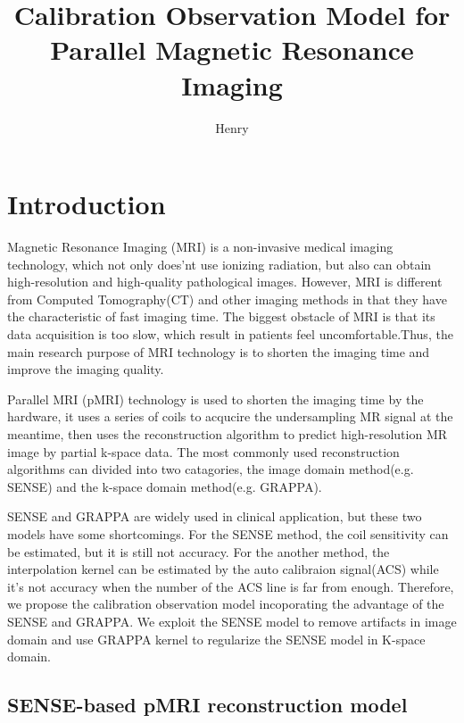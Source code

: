 \documentclass[UTF8]{article}
\begin{document}
\author{Henry}
\title{Calibration Observation Model for Parallel Magnetic Resonance Imaging}

\maketitle

\section{Introduction}
\par Magnetic Resonance Imaging (MRI) is a non-invasive medical imaging technology, which not only does'nt use ionizing radiation, but also can obtain high-resolution and high-quality pathological images. However, MRI is different from Computed Tomography(CT) and other imaging methods in that they have the characteristic of fast imaging time. The biggest obstacle of MRI is that its data acquisition is too slow, which result in patients feel uncomfortable.Thus, the main research purpose of MRI technology is to shorten the imaging time and improve the imaging quality. 
\par Parallel MRI (pMRI) technology is used to shorten the imaging time by the hardware, it uses a series of coils to acqucire the undersampling MR signal at the meantime, then uses the reconstruction algorithm to predict high-resolution MR image by partial k-space data. The most commonly used reconstruction algorithms can divided into two catagories, the image domain method(e.g. SENSE) and the k-space domain method(e.g. GRAPPA).

\par SENSE and GRAPPA are widely used in clinical application, but these two models have some shortcomings. For the SENSE method, the coil sensitivity can be estimated, but it is still not accuracy. For the another method, the interpolation kernel can be estimated by the auto calibraion signal(ACS) while it's not accuracy when the number of the ACS line is far from enough. Therefore, we propose the calibration observation model incoporating the advantage of the SENSE and GRAPPA. We exploit the SENSE model to remove artifacts in image domain and use GRAPPA kernel to regularize the SENSE model in K-space domain.
\subsection{SENSE-based pMRI reconstruction model}
\end{document}
